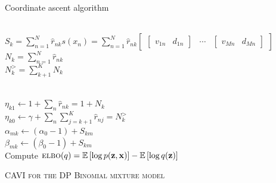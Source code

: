\documentclass{beamer}
\newcommand{\bx}{\ensuremath{\mathbf{x}}}
\newcommand{\bz}{\ensuremath{\mathbf{z}}}
\newcommand{\EE}[1]{\mathbb{E}\left[#1\right]}
\newcommand{\ELBO}{\textsc{elbo}}
\begin{document}
\begin{frame}{Coordinate ascent algorithm}
\begin{center}
{\begin{minipage}{1.25\linewidth}
\begin{algorithm}[H]
{	\vspace{0.1cm}	
	 \\
		 \hspace{1cm} $S_k = \sum_{n=1}^N \hat{r}_{nk} s(x_n) = \sum_{n=1}^N \hat{r}_{nk} \begin{bmatrix}
				\begin{bmatrix}
				 v_{1n} &  d_{1n}
				\end{bmatrix} & \cdots &
				\begin{bmatrix}
				 v_{Mn} &  d_{Mn}
				\end{bmatrix}
			\end{bmatrix}$ \\
		\hspace{1cm} $N_k = \sum_{n=1}^N \hat{r}_{nk}$ \\
		\hspace{1cm} $N_k^> = \sum_{k+1}^K N_k$
	
	\vspace{0.1cm}	
	 \\
		\hspace{1cm} $\eta_{k1} \leftarrow 1 + \sum_n \hat{r}_{nk} = 1 + N_k$ \\
		\hspace{1cm} $\eta_{k0} \leftarrow \gamma + \sum_n \sum_{j=k+1}^K \hat{r}_{nj} = N_k^>$\\
		\hspace{1cm} $\alpha_{mk} \leftarrow  (\alpha_0 - 1) + S_{km}$ \\
		\hspace{1cm} $ \beta_{mk} \leftarrow (\beta_0 - 1) + S_{km}$ \\
	\vspace{0.1cm}		
  Compute $\ELBO(q) = \EE{\log p(\bz, \bx)} - \EE{\log q(\bz)}$
}
\caption{\textsc{CAVI for the DP Binomial mixture model}}
\label{alg:cavi}
\end{algorithm}
    \end{minipage}%
    }
  \end{center}
\end{frame}


\end{document}
